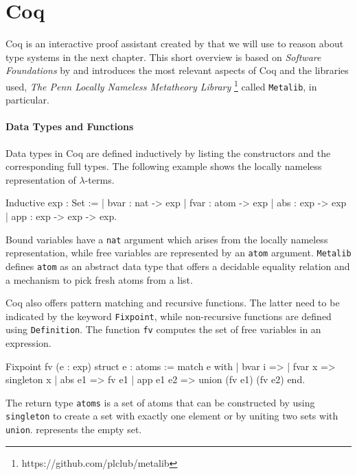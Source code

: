 \documentclass[a4paper, 11pt, fleqn]{scrreprt}
\newcommand{\coqinline}[1]{\texttt{#1}}
\begin{document}
	\section{Coq}
	Coq is an interactive proof assistant created by \cite{CoqManualV8} that we will use to reason about type systems in the next chapter. This short overview is based on \textit{Software Foundations} by \citet{Pierce:SF} and introduces the most relevant aspects of Coq and the libraries used, \textit{The Penn Locally Nameless Metatheory Library }\footnote{https://github.com/plclub/metalib} called \texttt{Metalib}, in particular.
	
	\paragraph{Data Types and Functions}
	Data types in Coq are defined inductively by listing the constructors and the corresponding full types. The following example shows the locally nameless representation of $\lambda$-terms.
	\begin{coqcode}
Inductive exp : Set :=
| bvar : nat  -> exp
| fvar : atom -> exp
| abs  : exp  -> exp
| app  : exp  -> exp -> exp.
	\end{coqcode}
    Bound variables have a \coqinline{nat} argument which arises from the locally nameless representation, while free variables are represented by an \coqinline{atom} argument. \coqinline{Metalib} defines \coqinline{atom} as an abstract data type that offers a decidable equality relation and a mechanism to pick fresh atoms from a list.
    \par
    Coq also offers pattern matching and recursive functions. The latter need to be indicated by the keyword \coqinline{Fixpoint}, while non-recursive functions are defined using \coqinline{Definition}. The function \coqinline{fv} computes the set of free variables in an expression.
	\begin{coqcode}
Fixpoint fv (e : exp) {struct e} : atoms :=
match e with
| bvar i => {}
| fvar x => singleton x
| abs e1 => fv e1
| app e1 e2 => union (fv e1) (fv e2)
end.
	\end{coqcode}
	The return type \coqinline{atoms} is a set of atoms that can be constructed by using \coqinline{singleton} to create a set with exactly one element or by uniting two sets with \coqinline{union}. \coqinline{{}} represents the empty set.
	
\end{document}
